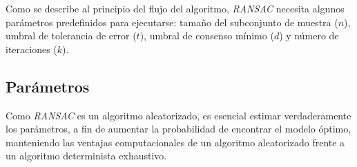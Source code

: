 
Como se describe al principio del flujo del algoritmo, \textit{RANSAC} necesita algunos parámetros predefinidos para ejecutarse: tamaño del subconjunto de muestra ($n$), umbral de tolerancia de error ($t$), umbral de consenso mínimo ($d$) y número de iteraciones ($k$).

\subsection{Parámetros}

Como \textit{RANSAC} es un algoritmo aleatorizado, es esencial estimar verdaderamente los parámetros, a fin de aumentar la probabilidad de encontrar el modelo óptimo, manteniendo las ventajas computacionales de un algoritmo aleatorizado frente a un algoritmo determinista exhaustivo.\\

